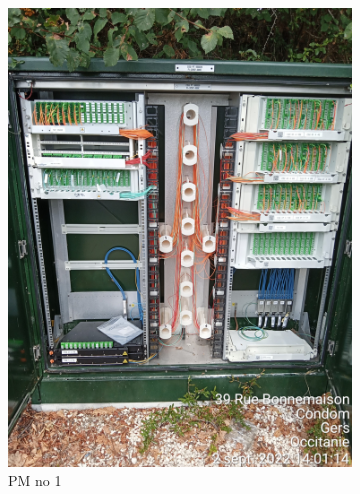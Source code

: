 \begin{figure}[H]
    \centering
    \begin{subfigure}{0.3\textwidth}
        \includegraphics[width=\linewidth]{images/pm_example.jpg}
        \caption{PM no 1}
    \end{subfigure}
    \begin{subfigure}{0.3\textwidth}

\end{subfigure}
\end{figure}
